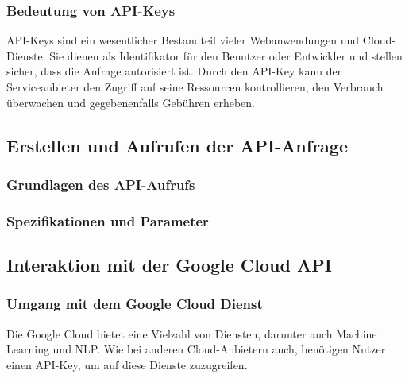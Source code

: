 \documentclass[12pt,a4paper]{article}
\begin{document}
\subsubsection{Bedeutung von API-Keys}

API-Keys sind ein wesentlicher Bestandteil vieler Webanwendungen und Cloud-Dienste. Sie dienen als Identifikator für den Benutzer oder Entwickler und stellen sicher, dass die Anfrage autorisiert ist. Durch den API-Key kann der Serviceanbieter den Zugriff auf seine Ressourcen kontrollieren, den Verbrauch überwachen und gegebenenfalls Gebühren erheben.

\subsection{Erstellen und Aufrufen der API-Anfrage}
\subsubsection{Grundlagen des API-Aufrufs}
\subsubsection{Spezifikationen und Parameter}








































\newpage
\subsection{Interaktion mit der Google Cloud API}
\subsubsection{Umgang mit dem Google Cloud Dienst}	
Die Google Cloud bietet eine Vielzahl von Diensten, darunter auch Machine Learning und NLP. Wie bei anderen Cloud-Anbietern auch, benötigen Nutzer einen API-Key, um auf diese Dienste zuzugreifen.
\end{document}
